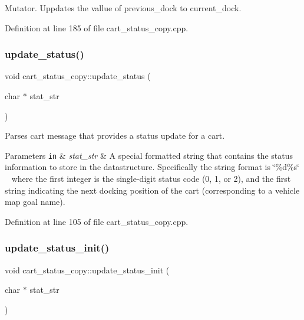 Mutator. Uppdates the vallue of previous\+\_\+dock to current\+\_\+dock. 

Definition at line 185 of file cart\+\_\+status\+\_\+copy.\+cpp.

\mbox{\label{classcart__status__copy_ace79b133b98000c72617917b1f434df8}} 
\subsubsection{\texorpdfstring{update\+\_\+status()}{update\_status()}}
{\footnotesize\ttfamily void cart\+\_\+status\+\_\+copy\+::update\+\_\+status (\begin{DoxyParamCaption}\item[{char $\ast$}]{stat\+\_\+str }\end{DoxyParamCaption})}

Parses cart message that provides a status update for a cart. 
\begin{DoxyParams}[1]{Parameters}
\mbox{\tt in}  & {\em stat\+\_\+str} & A special formatted string that contains the status information to store in the datastructure. Specifically the string format is \char`\"{}\%d\%s\char`\"{} ~\newline
 where the first integer is the single-\/digit status code (0, 1, or 2), and the first string indicating the next docking position of the cart (corresponding to a vehicle map goal name). \\
\hline
\end{DoxyParams}


Definition at line 105 of file cart\+\_\+status\+\_\+copy.\+cpp.

\mbox{\label{classcart__status__copy_ac0af1c110916a2fdd7ab7198bdca183a}} 
\subsubsection{\texorpdfstring{update\+\_\+status\+\_\+init()}{update\_status\_init()}}
{\footnotesize\ttfamily void cart\+\_\+status\+\_\+copy\+::update\+\_\+status\+\_\+init (\begin{DoxyParamCaption}\item[{char $\ast$}]{stat\+\_\+str }\end{DoxyParamCaption})}

